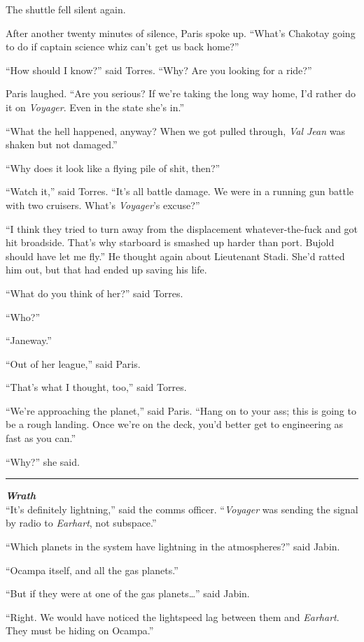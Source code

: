 \documentclass[twoside,letterpaper,12pt]{memoir}
\begin{document}
The shuttle fell silent again.

After another twenty minutes of silence, Paris spoke up. ``What's Chakotay going to do if captain science whiz can't get us back home?''

``How should I know?'' said Torres. ``Why? Are you looking for a ride?''

Paris laughed. ``Are you serious? If we're taking the long way home, I'd rather do it on \textit{Voyager}. Even in the state she's in.''

``What the hell happened, anyway? When we got pulled through, \textit{Val Jean} was shaken but not damaged.''

``Why does it look like a flying pile of shit, then?''

``Watch it,'' said Torres. ``It’s all battle damage. We were in a running gun battle with two cruisers. What's \textit{Voyager}'s excuse?''

``I think they tried to turn away from the displacement whatever-the-fuck and got hit broadside. That’s why starboard is smashed up harder than port. Bujold should have let me fly.'' He thought again about Lieutenant Stadi. She’d ratted him out, but that had ended up saving his life.

``What do you think of her?'' said Torres.

``Who?''

``Janeway.''

``Out of her league,'' said Paris.

``That's what I thought, too,'' said Torres.

``We're approaching the planet,'' said Paris. ``Hang on to your ass; this is going to be a rough landing. Once we're on the deck, you'd better get to engineering as fast as you can.''

``Why?'' she said.

\fancybreak{\rule{3cm}{0.4 pt}}
\noindent\textit{\textbf{Wrath}}\\

``It's definitely lightning,'' said the comms officer. ``\textit{Voyager} was sending the signal by radio to \textit{Earhart}, not subspace.''

``Which planets in the system have lightning in the atmospheres?'' said Jabin.

``Ocampa itself, and all the gas planets.''

``But if they were at one of the gas planets\ldots '' said Jabin.

``Right. We would have noticed the lightspeed lag between them and \textit{Earhart}. They must be hiding on Ocampa.''
\end{document}
